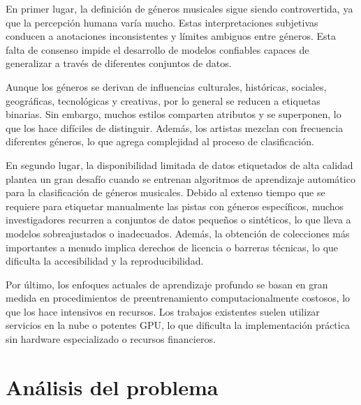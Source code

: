 \documentclass[colorinlistoftodos,twoside,twocolumn,10pt]{article} %
\begin{document}
En primer lugar, la definición de géneros musicales sigue siendo controvertida, ya que la percepción humana varía mucho. Estas interpretaciones subjetivas conducen a anotaciones inconsistentes  y límites ambiguos entre géneros. Esta falta de consenso impide el desarrollo de modelos confiables capaces de generalizar a través de diferentes conjuntos de datos.

Aunque los géneros se derivan de influencias culturales, históricas, sociales, geográficas, tecnológicas y creativas, por lo general se reducen a etiquetas binarias. Sin embargo, muchos estilos comparten atributos y se superponen, lo que los hace difíciles de distinguir. Además, los artistas mezclan con frecuencia diferentes géneros, lo que agrega complejidad al proceso de clasificación.

En segundo lugar, la disponibilidad limitada de datos etiquetados de alta calidad plantea un gran desafío cuando se entrenan algoritmos de aprendizaje automático para la clasificación de géneros musicales. Debido al extenso tiempo que se requiere para etiquetar manualmente las pistas con géneros específicos, muchos investigadores recurren a conjuntos de datos pequeños o sintéticos, lo que lleva a modelos sobreajustados o inadecuados. Además, la obtención de colecciones más importantes a menudo implica derechos de licencia o barreras técnicas, lo que dificulta la accesibilidad y la reproducibilidad.

Por último, los enfoques actuales de aprendizaje profundo se basan en gran medida en procedimientos de preentrenamiento computacionalmente costosos, lo que los hace intensivos en recursos. Los trabajos existentes suelen utilizar servicios en la nube o potentes GPU, lo que dificulta la implementación práctica sin hardware especializado o recursos financieros. 
	  

\section {An\'alisis del problema}
\end{document}
